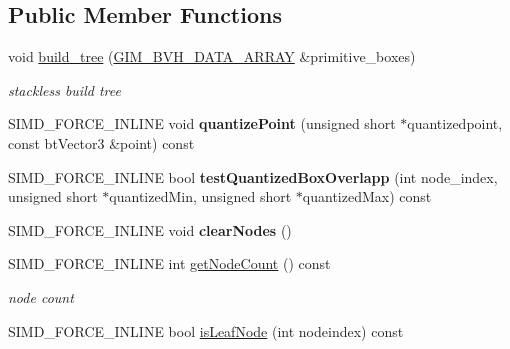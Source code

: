 \subsection*{Public Member Functions}
\textbf{ }\par
\begin{DoxyCompactItemize}
\item 
void \hyperlink{classbtQuantizedBvhTree_aa2229fd3e3e2004cdf8151437535e936}{build\+\_\+tree} (\hyperlink{classGIM__BVH__DATA__ARRAY}{G\+I\+M\+\_\+\+B\+V\+H\+\_\+\+D\+A\+T\+A\+\_\+\+A\+R\+R\+AY} \&primitive\+\_\+boxes)
\begin{DoxyCompactList}\small\item\em stackless build tree \end{DoxyCompactList}\item 
\mbox{\label{classbtQuantizedBvhTree_a2a262cccd5861d760d366a0c5ba3be65}} 
S\+I\+M\+D\+\_\+\+F\+O\+R\+C\+E\+\_\+\+I\+N\+L\+I\+NE void {\bfseries quantize\+Point} (unsigned short $\ast$quantizedpoint, const bt\+Vector3 \&point) const
\item 
\mbox{\label{classbtQuantizedBvhTree_aa6444b908504b9fc203b128caf0d38d5}} 
S\+I\+M\+D\+\_\+\+F\+O\+R\+C\+E\+\_\+\+I\+N\+L\+I\+NE bool {\bfseries test\+Quantized\+Box\+Overlapp} (int node\+\_\+index, unsigned short $\ast$quantized\+Min, unsigned short $\ast$quantized\+Max) const
\item 
\mbox{\label{classbtQuantizedBvhTree_a893b44b85db31fc25346bcd20659bf64}} 
S\+I\+M\+D\+\_\+\+F\+O\+R\+C\+E\+\_\+\+I\+N\+L\+I\+NE void {\bfseries clear\+Nodes} ()
\item 
\mbox{\label{classbtQuantizedBvhTree_ad7a4d4402d47e0c7dadda291e5a0f969}} 
S\+I\+M\+D\+\_\+\+F\+O\+R\+C\+E\+\_\+\+I\+N\+L\+I\+NE int \hyperlink{classbtQuantizedBvhTree_ad7a4d4402d47e0c7dadda291e5a0f969}{get\+Node\+Count} () const
\begin{DoxyCompactList}\small\item\em node count \end{DoxyCompactList}\item 
\mbox{\label{classbtQuantizedBvhTree_a0bd0a4504cc0b61551234c411637fcf0}} 
S\+I\+M\+D\+\_\+\+F\+O\+R\+C\+E\+\_\+\+I\+N\+L\+I\+NE bool \hyperlink{classbtQuantizedBvhTree_a0bd0a4504cc0b61551234c411637fcf0}{is\+Leaf\+Node} (int nodeindex) const

\end{DoxyCompactItemize}
